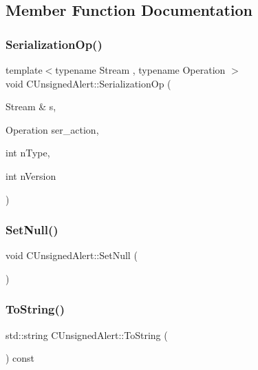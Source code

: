 \subsection{Member Function Documentation}
\mbox{\label{class_c_unsigned_alert_acdf81abb731f9fc8d2c04618f2f4d79d}} 
\subsubsection{\texorpdfstring{Serialization\+Op()}{SerializationOp()}}
{\footnotesize\ttfamily template$<$typename Stream , typename Operation $>$ \\
void C\+Unsigned\+Alert\+::\+Serialization\+Op (\begin{DoxyParamCaption}\item[{Stream \&}]{s,  }\item[{Operation}]{ser\+\_\+action,  }\item[{int}]{n\+Type,  }\item[{int}]{n\+Version }\end{DoxyParamCaption})\hspace{0.3cm}{\ttfamily [inline]}}

\mbox{\label{class_c_unsigned_alert_a9d387307eb60095e50134d10eea3ad69}} 
\subsubsection{\texorpdfstring{Set\+Null()}{SetNull()}}
{\footnotesize\ttfamily void C\+Unsigned\+Alert\+::\+Set\+Null (\begin{DoxyParamCaption}{ }\end{DoxyParamCaption})}

\mbox{\label{class_c_unsigned_alert_a1ba948e1de4803565ec0dbec267eadb4}} 
\subsubsection{\texorpdfstring{To\+String()}{ToString()}}
{\footnotesize\ttfamily std\+::string C\+Unsigned\+Alert\+::\+To\+String (\begin{DoxyParamCaption}{ }\end{DoxyParamCaption}) const}



